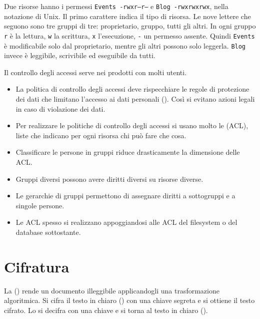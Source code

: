 \begin{esempio}
Due risorse hanno i permessi \texttt{Events -rwxr--r--} e \texttt{Blog -rwxrwxrwx}, nella notazione di Unix. Il primo
carattere indica il tipo di risorsa. Le nove lettere che seguono sono tre gruppi di tre: proprietario, gruppo, tutti
gli altri. In ogni gruppo \texttt{r} è la lettura, \texttt{w} la scrittura, \texttt{x} l'esecuzione, \texttt{-} un permesso
assente. Quindi \texttt{Events} è modificabile solo dal proprietario, mentre gli altri possono solo leggerla.
\texttt{Blog} invece è leggibile, scrivibile ed eseguibile da tutti.
\end{esempio}

Il controllo degli accessi serve nei prodotti con molti utenti.
\begin{itemize}
  \item La politica di controllo degli accessi deve rispecchiare le regole di protezione dei dati che limitano
    l'accesso ai dati personali (). Così si evitano azioni legali in caso di violazione dei dati.
  \item Per realizzare le politiche di controllo degli accessi si usano molto le  (ACL),
    liste che indicano per ogni risorsa chi può fare che cosa.
  \item Classificare le persone in gruppi riduce drasticamente la dimensione delle ACL.
  \item Gruppi diversi possono avere diritti diversi su risorse diverse.
  \item Le gerarchie di gruppi permettono di assegnare diritti a sottogruppi e a singole persone.
  \item Le ACL spesso si realizzano appoggiandosi alle ACL del filesystem o del database sottostante.
\end{itemize}

\section{Cifratura}
\label{sec:sic-cifratura}

\begin{definizione}[Cifratura]
La  () rende un documento illeggibile applicandogli una trasformazione
algoritmica. Si cifra il testo in chiaro () con una chiave segreta e si ottiene il testo cifrato. Lo
si decifra con una chiave e si torna al testo in chiaro ().
\end{definizione}

